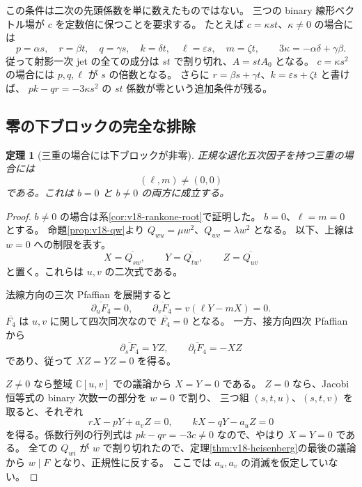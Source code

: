 \documentclass[11pt,a4paper]{ltjsarticle}
\newtheorem{theorem}{定理}[section]
\theoremstyle{remark}\newtheorem{remark}[theorem]{注意}
\begin{document}
この条件は二次の先頭係数を単に数えたものではない。
三つの binary 線形ベクトル場が $c$ を定数倍に保つことを要求する。
たとえば $c=\kappa st$、$\kappa\ne0$ の場合には
\begin{equation}\label{eq:v18-node-leading}
 p=\alpha s,\quad r=\beta t,\quad
 q=\gamma s,\quad k=\delta t,\quad
 \ell=\varepsilon s,\quad m=\zeta t,
 \qquad 3\kappa=-\alpha\delta+\gamma\beta.
\end{equation}
従って射影一次 jet の全ての成分は $st$ で割り切れ、$A=stA_0$ となる。
$c=\kappa s^2$ の場合には $p,q,\ell$ が $s$ の倍数となる。
さらに $r=\beta s+\gamma t$、$k=\varepsilon s+\zeta t$ と書けば、
$pk-qr=-3\kappa s^2$ の $st$ 係数が零という追加条件が残る。

\subsection{零の下ブロックの完全な排除}

\begin{theorem}[三重の場合には下ブロックが非零]\label{thm:v18-nonzero-block}
正規な退化五次因子を持つ三重の場合には
\[
                              (\ell,m)\ne(0,0)
\]
である。これは $b=0$ と $b\ne0$ の両方に成立する。
\end{theorem}
\begin{proof}
$b\ne0$ の場合は系\ref{cor:v18-rankone-root}で証明した。
$b=0$、$\ell=m=0$ とする。
命題\ref{prop:v18-qw}より $Q_{wu}=\mu w^2$、$Q_{wv}=\lambda w^2$ となる。
以下、上線は $w=0$ への制限を表す。
\[
              X=\overline{Q_{sw}},\qquad
              Y=\overline{Q_{tw}},\qquad
              Z=\overline{Q_{uv}}
\]
と置く。これらは $u,v$ の二次式である。

法線方向の三次 Pfaffian を展開すると
\[
 \overline{\partial_uF_4}=0,\qquad
 \overline{\partial_vF_4}=v(\ell Y-mX)=0.
\]
$\overline{F_4}$ は $u,v$ に関して四次同次なので $\overline{F_4}=0$ となる。
一方、接方向四次 Pfaffian から
\[
 \overline{\partial_sF_4}=YZ,
 \qquad\overline{\partial_tF_4}=-XZ
\]
であり、従って $XZ=YZ=0$ を得る。

$Z\ne0$ なら整域 $\mathbb C[u,v]$ での議論から $X=Y=0$ である。
$Z=0$ なら、Jacobi 恒等式の binary 次数一の部分を $w=0$ で割り、
三つ組 $(s,t,u)$、$(s,t,v)$ を取ると、それぞれ
\[
             rX-pY+a_vZ=0,\qquad kX-qY-a_uZ=0
\]
を得る。係数行列の行列式は $pk-qr=-3c\ne0$ なので、やはり $X=Y=0$ である。
全ての $Q_{wi}$ が $w$ で割り切れたので、定理\ref{thm:v18-heisenberg}の最後の議論から
$w\mid F$ となり、正規性に反する。
ここでは $a_u,a_v$ の消滅を仮定していない。
\end{proof}
\end{document}
